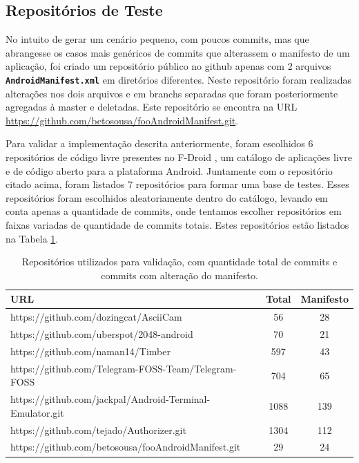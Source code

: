 \documentclass[a4paper,12pt]{article}
\begin{document}
{%
\subsection{Repositórios de Teste}%
\label{sec:repoteste}

No intuito de gerar um cenário pequeno, com poucos commits, mas que abrangesse os casos mais genéricos de commits que alterassem o manifesto de um aplicação, foi criado um repositório público no github apenas com 2 arquivos {\small\texttt{\textbf{AndroidManifest.xml}}} em diretórios diferentes. Neste repositório foram realizadas alterações nos dois arquivos e em branchs separadas que foram posteriormente agregadas à master e deletadas. Este repositório se encontra na URL {\fontsize{10pt}{12pt}\url{https://github.com/betosousa/fooAndroidManifest.git}}.

Para validar a implementação descrita anteriormente, foram escolhidos 6 repositórios de código livre presentes no F-Droid \cite{fdroid}, um catálogo de aplicações livre e de código aberto para a plataforma Android. Juntamente com o repositório citado acima, foram listados 7 repositórios para formar uma base de testes. Esses repositórios foram escolhidos aleatoriamente dentro do catálogo, levando em conta apenas a quantidade de commits, onde tentamos escolher repositórios em faixas variadas de quantidade de commits totais. Estes repositórios estão listados na Tabela \ref{tab:repotest}.


\begin{table}[h]
\begin{center}
\begin{tabular}{l|c|c}

 URL & Total & Manifesto\\
\hline
https://github.com/dozingcat/AsciiCam & 56 & 28 \\
https://github.com/uberspot/2048-android & 70 & 21 \\
https://github.com/naman14/Timber & 597 & 43 \\
https://github.com/Telegram-FOSS-Team/Telegram-FOSS & 704 & 65 \\
https://github.com/jackpal/Android-Terminal-Emulator.git & 1088 & 139 \\
https://github.com/tejado/Authorizer.git & 1304 & 112 \\
https://github.com/betosousa/fooAndroidManifest.git & 29 & 24
\end{tabular}
\caption{Repositórios utilizados para validação, com quantidade total de commits e commits com alteração do manifesto.}
\label{tab:repotest}
\end{center}
\end{table}

}
\end{document}
